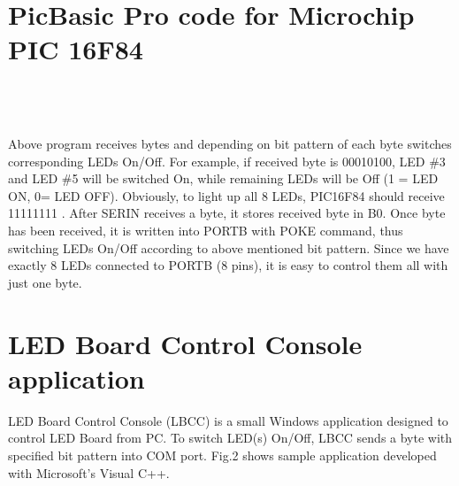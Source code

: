 \documentclass{article}
\begin{document}
\section{PicBasic Pro code for Microchip PIC 16F84}
\vspace*{0.1in} 
\\ \\ \\
Above program receives bytes and depending on bit pattern of each
byte switches corresponding LEDs On/Off. For example, if received
byte is 00010100, LED \#3 and LED \#5 will be switched On, while
remaining LEDs will be Off (1 = LED ON, 0= LED OFF). Obviously, to
light up all 8 LEDs, PIC16F84 should receive 11111111 . After SERIN
receives a byte, it stores received byte in B0. Once byte has been
received, it is written into PORTB with POKE command, thus switching
LEDs On/Off according to above mentioned bit pattern. Since we have
exactly 8 LEDs connected to PORTB (8 pins), it is easy to control
them all with just one byte.
\section{LED Board Control Console application}
LED Board Control Console (LBCC) is a small Windows application
designed to control LED Board from PC. To switch LED(s) On/Off, LBCC
sends a byte with specified bit pattern into COM port. Fig.2 shows
sample application developed with Microsoft's Visual C++.
\end{document}
